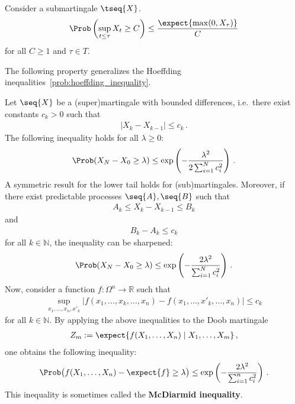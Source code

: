     \begin{property}\label{prob:doob_inequality}
        Consider a \cdlg submartingale $\tseq{X}$.
        \begin{gather}
            \Prob\left(\sup_{t\leq\tau}X_t\geq C\right)\leq\frac{\expect{\max(0,X_\tau)}}{C}
        \end{gather}
        for all $C\geq1$ and $\tau\in T$.
    \end{property}

    The following property generalizes the Hoeffding inequalities~\cref{prob:hoeffding_inequality}.
    \begin{property}\label{prob:hoeffding_azuma}
        Let $\seq{X}$ be a (super)martingale with bounded differences, i.e.~there exist constants $c_k>0$ such that
        \begin{gather}
            |X_k-X_{k-1}|\leq c_k\,.
        \end{gather}
        The following inequality holds for all $\lambda\geq0$:
        \begin{gather}
            \Prob(X_N-X_0\geq\lambda)\leq\exp\left(-\frac{\lambda^2}{2\sum_{i=1}^Nc_i^2}\right)\,.
        \end{gather}
        A symmetric result for the lower tail holds for (sub)martingales. Moreover, if there exist predictable processes $\seq{A},\seq{B}$ such that
        \begin{gather}
            A_k\leq X_k-X_{k-1}\leq B_k
        \end{gather}
        and
        \begin{gather}
            B_k-A_k\leq c_k
        \end{gather}
        for all $k\in\mathbb{N}$, the inequality can be sharpened:
        \begin{gather}
            \Prob(X_N-X_0\geq\lambda)\leq\exp\left(-\frac{2\lambda^2}{\sum_{i=1}^Nc_i^2}\right)\,.
        \end{gather}
        Now, consider a function $f:\Omega^n\rightarrow\mathbb{R}$ such that
        \begin{gather}
            \sup_{x_1,\ldots,x_n,x'_k}|f(x_1,\ldots,x_k,\ldots,x_n)-f(x_1,\ldots,x'_k,\ldots,x_n)|\leq c_k
        \end{gather}
        for all $k\in\mathbb{N}$. By applying the above inequalities to the Doob martingale
        \begin{gather}
            Z_m:=\expect{f(X_1,\ldots,X_n)\mid X_1,\ldots,X_m}\,,
        \end{gather}
        one obtains the following inequality:
        \begin{gather}
            \Prob\bigl(f(X_1,\ldots,X_n)-\expect{f}\geq\lambda\bigr)\leq\exp\left(-\frac{2\lambda^2}{\sum_{i=1}^nc_i^2}\right)\,.
        \end{gather}
        This inequality is sometimes called the \textbf{McDiarmid inequality}.
    \end{property}

